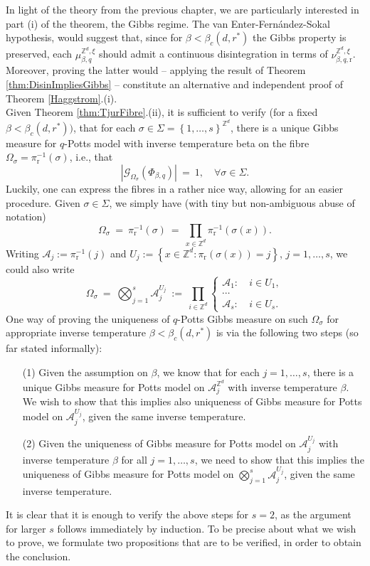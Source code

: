 \documentclass[12pt]{article}
\newcommand{\A}{\mathcal{A}}
\newcommand{\G}{\mathcal{G}}
\renewcommand{\r}{\mathrm{r}}
\newcommand{\Z}{\mathbb{Z}}
\newcommand{\set}[1]{\left\{#1\right\}}
\newcommand{\1}{\mathbbm{1}}
\newcommand{\5}{\vspace{0.5cm}}
\theoremstyle{definition}
\begin{document}
In light of the theory from the previous chapter, we are particularly interested in part (i) of the theorem, the Gibbs regime. The van Enter-Fern\'andez-Sokal hypothesis, would suggest that, since for $\beta<\beta_c(d,r^*)$ the Gibbs property is preserved, each $\mu_{\beta,q}^{\Z^d,\xi}$ should admit a continuous disintegration in terms of $\nu_{\beta,q,\r}^{\Z^d,\xi}$. Moreover, proving the latter would -- applying the result of Theorem \ref{thm:DisinImpliesGibbs} -- constitute an alternative and independent proof of Theorem \ref{Haggstrom}.(i). \\

Given Theorem \ref{thm:TjurFibre}.(ii), it is sufficient to verify (for a fixed $\beta<\beta_c(d,r^*))$, that for each $\sigma\in\Sigma=\set{1,\ldots,s}^{\Z^d}$, there is a unique Gibbs measure for $q$-Potts model with inverse temperature beta on the fibre $\Omega_\sigma=\pi_\r^{-1}(\sigma)$, i.e., that
$$|\G_{\Omega_\sigma}(\Phi_{\beta,q})| ~=~ 1, \quad \forall \sigma\in\Sigma.$$
Luckily, one can express the fibres in a rather nice way, allowing for an easier procedure. Given $\sigma\in\Sigma$, we simply have (with tiny but non-ambiguous abuse of notation)
$$\Omega_\sigma ~=~ \pi_{\r}^{-1}(\sigma) ~=~ \prod_{x\in\Z^d}\pi_{\r}^{-1}(\sigma(x)).$$
Writing $\A_j:=\pi_{\r}^{-1}(j)$ and $U_j:=\set{x\in\Z^d:\pi_{\r}(\sigma(x))=j}$, $j=1,\ldots,s$, we could also write
$$\Omega_\sigma ~=~ \bigotimes_{j=1}^s\A_j^{U_j} ~:=~ \prod_{i\in\Z^d}\begin{cases}\A_1:~&i\in U_1,\\
\cdots\\
\A_s:~&i\in U_s.\end{cases}$$
One way of proving the uniqueness of $q$-Potts Gibbs measure on such $\Omega_\sigma$ for appropriate inverse temperature $\beta<\beta_c(d,r^*)$ is via the following two steps (so far stated informally):
\begin{itemize}
	\item[(1)] Given the assumption on $\beta$, we know that for each $j=1,\ldots,s$, there is a unique Gibbs measure for Potts model on $\A_j^{\Z^d}$ with inverse temperature $\beta$. We wish to show that this implies also uniqueness of Gibbs measure for Potts model on $\A_j^{U_j}$, given the same inverse temperature.
	\item[(2)] Given the uniqueness of Gibbs measure for Potts model on $\A_j^{U_j}$ with inverse temperature $\beta$ for all $j=1,\ldots,s$, we need to show that this implies the uniqueness of Gibbs measure for Potts model on $\bigotimes_{j=1}^s \A_j^{U_j}$, given the same inverse temperature.
\end{itemize}
It is clear that it is enough to verify the above steps for $s=2$, as the argument for larger $s$ follows immediately by induction. To be precise about what we wish to prove, we formulate two propositions that are to be verified, in order to obtain the conclusion.
\end{document}
